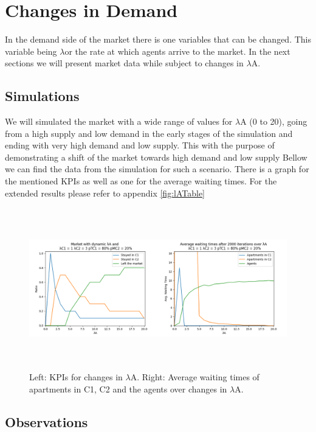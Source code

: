 \section{Changes in Demand}

In the demand side of the market there is one variables that can be changed. This variable being $\lambda$\A or the rate at which agents arrive to the market. In the next sections we will present market data while subject to changes in $\lambda$A.

\subsection{Simulations}

We will simulated the market with a wide range of values for $\lambda$A (0 to 20), going from a high supply and low demand in the early stages of the simulation and ending with very high demand and low supply. This with the purpose of demonstrating a shift of the market towards high demand and low supply Bellow we can find the data from the simulation for such a scenario. There is a graph for the mentioned KPIs as well as one for the average waiting times. For the extended results please refer to appendix \ref{fig:lATable} 


\begin{figure}
    \centering
    \includegraphics[width=1\linewidth, height = 7cm]{figures/lambdaA.png}
    \caption{Left: KPIs for changes in $\lambda$A. Right: Average waiting times of apartments in C1, C2 and the agents over changes in $\lambda$A.}
    \label{fig:KPIslambdaA}
\end{figure}

\subsection{Observations}

